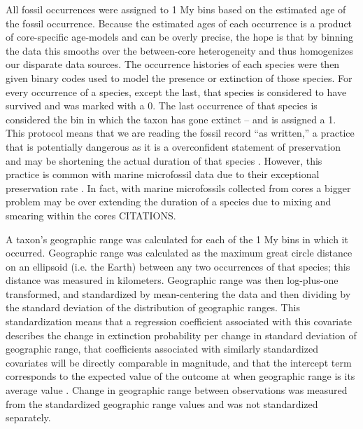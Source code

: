 \documentclass[12pt,letterpaper]{article}
\begin{document}
All fossil occurrences were assigned to 1 My bins based on the estimated age of the fossil occurrence. Because the estimated ages of each occurrence is a product of core-specific age-models and can be overly precise, the hope is that by binning the data this smooths over the between-core heterogeneity and thus homogenizes our disparate data sources. The occurrence histories of each species were then given binary codes used to model the presence or extinction of those species. For every occurrence of a species, except the last, that species is considered to have survived and was marked with a 0. The last occurrence of that species is considered the bin in which the taxon has gone extinct -- and is assigned a 1. This protocol means that we are reading the fossil record ``as written,'' a practice that is potentially dangerous as it is a overconfident statement of preservation and may be shortening the actual duration of that species \citep{Alroy2010,Alroy2000b,Alroy2014,Foote1997,Foote1999a,Foote2001,Foote1996e,Lloyd2012b,Marshall1995,Wang2016}. However, this practice is common with marine microfossil data due to their exceptional preservation rate \citep{Ezard2013,Ezard2016,Ezard2011,Liow2010}. In fact, with marine microfossils collected from cores a bigger problem may be over extending the duration of a species due to mixing and smearing within the cores CITATIONS.

A taxon's geographic range was calculated for each of the 1 My bins in which it occurred. Geographic range was calculated as the maximum great circle distance on an ellipsoid (i.e. the Earth) between any two occurrences of that species; this distance was measured in kilometers. Geographic range was then log-plus-one transformed, and standardized by mean-centering the data and then dividing by the standard deviation of the distribution of geographic ranges. This standardization means that a regression coefficient associated with this covariate describes the change in extinction probability per change in standard deviation of geographic range, that coefficients associated with similarly standardized covariates will be directly comparable in magnitude, and that the intercept term corresponds to the expected value of the outcome at when geographic range is its average value \citep{ARM}. Change in geographic range between observations was measured from the standardized geographic range values and was not standardized separately.
\end{document}
